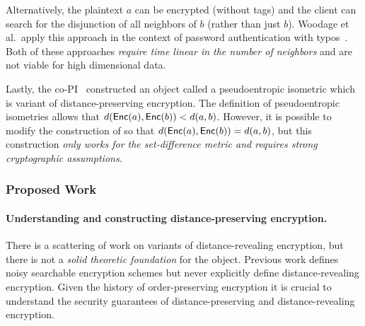 \iffalse
The approach can be summarized as follows:
\begin{enumerate}\setlength\itemsep{0em}
\item The clients appends to $\enc(a)$ a deterministic encryption of all $b$ such that $d(a,b) \le 1$.
\item To search, the client deterministically encrypts their search term $b$.
\item The server returns all ciphertexts where some encryption matches.\footnote{Some  modifications are necessary to meet ideal security such as hiding the number of neighbors.  See the prior work of Boldyreva and Chenette~\cite{boldyreva2014efficient}.}  
\end{enumerate}
\fi

Alternatively, the plaintext $a$ can be encrypted (without tags) and the client can search for the disjunction of all neighbors of $b$ (rather than just $b$).  Woodage et al.~apply this approach in the context of password authentication with typos~\cite{C:WCDJR17}.  Both of these approaches {\em require time linear in the number of neighbors} and are not viable for high dimensional data.

Lastly, the co-PI~\cite{EPRINT:ABCFG16} constructed an object called a pseudoentropic isometric which is variant of distance-preserving encryption.  The definition of pseudoentropic isometries allows that $d(\mathsf{Enc}(a), \mathsf{Enc}(b)) <d(a,b)$.  However, it is possible to modify the construction of \cite{EPRINT:ABCFG16} so that $d(\mathsf{Enc}(a), \mathsf{Enc}(b)) = d(a,b)$, but this construction {\em only works for the set-difference metric and requires strong cryptographic assumptions}.

\subsubsection{Proposed Work}

\paragraph{Understanding and constructing distance-preserving encryption.}
There is a scattering of work on variants of distance-revealing encryption, but there is not a {\em solid theoretic foundation} for the object.  Previous work defines noisy searchable encryption schemes but never explicitly define distance-revealing encryption.   Given the history of order-preserving encryption it is crucial to understand the security guarantees of distance-preserving and distance-revealing encryption. %

